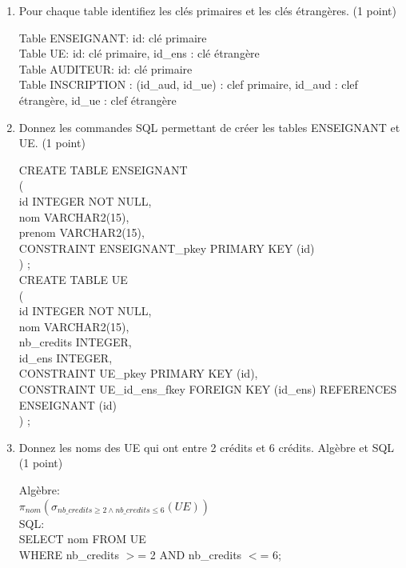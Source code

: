 \begin{enumerate}

  \item Pour chaque table identifiez les cl\'es primaires et les cl\'es \'etrang\`eres. (1 point)
\begin{correction}
    Table ENSEIGNANT: id: cl\'e primaire\\
    Table UE: id: cl\'e primaire, id\_ens : cl\'e \'etrang\`ere\\
    Table AUDITEUR: id: cl\'e primaire\\
    Table INSCRIPTION : (id\_aud, id\_ue) : clef primaire, id\_aud : clef \'etrang\`ere, id\_ue : clef \'etrang\`ere
\end{correction}

  \item Donnez les commandes SQL permettant de cr\'eer les tables ENSEIGNANT et UE. (1 point)
\begin{correction}
  CREATE TABLE ENSEIGNANT\\
(\\
  id INTEGER NOT NULL,\\
  nom VARCHAR2(15),\\
  prenom VARCHAR2(15),\\
  CONSTRAINT ENSEIGNANT\_pkey PRIMARY KEY (id)\\
) ;\\

CREATE TABLE UE\\
(\\
  id INTEGER NOT NULL,\\
  nom VARCHAR2(15),\\
  nb\_credits INTEGER,\\
  id\_ens INTEGER,\\
  CONSTRAINT UE\_pkey PRIMARY KEY (id),\\
  CONSTRAINT UE\_id\_ens\_fkey FOREIGN KEY (id\_ens)
      REFERENCES ENSEIGNANT (id) \\
) ;\\

\end{correction}

  \item Donnez les noms des UE qui ont entre 2 cr\'edits et 6 cr\'edits. Alg\`ebre et SQL (1 point)
\begin{correction}
    Alg\`ebre:\\
    $\pi_{nom}(\sigma_{nb\_credits \ge 2 \land nb\_credits \le 6}(UE))$\\
    SQL: \\
    SELECT nom FROM UE\\
    WHERE nb\_credits $>$= 2 AND nb\_credits $<$= 6;
\end{correction}


\end{enumerate}
